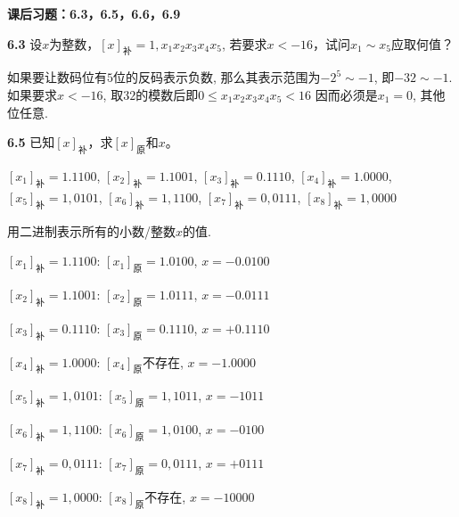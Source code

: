 \documentclass[UTF8]{report}
\newcommand{\problem}[1]{{\setlength{\parskip}{10pt}\noindent \bf{#1}}}
\newenvironment{solution}{{\noindent\hskip 2em \bf 解 \quad}}{}
\begin{document}

\maketitle



\textbf{课后习题：6.3，6.5，6.6，6.9}

\problem{6.3} 设$x$为整数，$[x]_{\text{补}}=1,x_1x_2x_3x_4x_5 $, 若要求$x < -16$，试问$x_1\sim x_5$应取何值？

\begin{solution}
    如果要让数码位有$5$位的反码表示负数, 那么其表示范围为$-2^5
    \sim -1$, 即$-32\sim -1$. 如果要求$x < -16$, 取$32$的模数后即$0\leq x_1x_2x_3x_4x_5 < 16$ 因而必须是$x_1=0$, 其他位任意.
\end{solution}


\problem{6.5} 已知$[x]_{\text{补}}$，求$[x]_{\text{原}}$和$x$。

$[x_1]_{\text{补}}=1. 1100$, $[x_2]_{\text{补}}=1. 1001$, $[x_3]_{\text{补}}=0. 1110$, $[x_4]_{\text{补}}=1. 0000$, $[x_5]_{\text{补}}=1, 0101$, $[x_6]_{\text{补}}=1, 1100$, $[x_7]_{\text{补}}=0, 0111$, $[x_8]_{\text{补}}=1, 0000$


\begin{solution}
    用二进制表示所有的小数/整数$x$的值. 

    $[x_1]_{\text{补}}=1. 1100$: $[x_1]_{\text{原}}=1.0100$, $x=-0.0100$

    $[x_2]_{\text{补}}=1. 1001$: $[x_2]_{\text{原}}=1.0111$, $x=-0.0111$

    $[x_3]_{\text{补}}=0. 1110$: $[x_3]_{\text{原}}=0.1110$, $x=+0.1110$

    $[x_4]_{\text{补}}=1. 0000$: $[x_4]_{\text{原}}$不存在, $x=-1.0000$

    $[x_5]_{\text{补}}=1, 0101$: $[x_5]_{\text{原}}=1,1011$, $x=-1011$

    $[x_6]_{\text{补}}=1, 1100$: $[x_6]_{\text{原}}=1,0100$, $x=-0100$

    $[x_7]_{\text{补}}=0, 0111$: $[x_7]_{\text{原}}=0,0111$, $x=+0111$

    $[x_8]_{\text{补}}=1, 0000$: $[x_8]_{\text{原}}$不存在, $x=-10000$
\end{solution}
\end{document}
